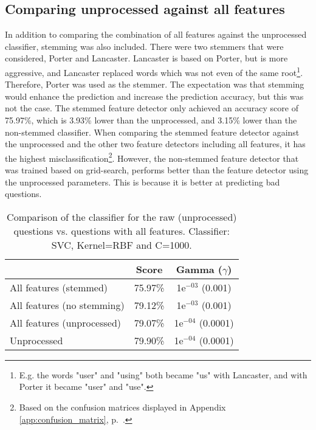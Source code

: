 \subsection{Comparing unprocessed against all features}
\label{sec:comparing_unprocessed_all_features}
In addition to comparing the combination of all features against the unprocessed classifier, stemming was also included. 
There were two stemmers that were considered, Porter and Lancaster.
Lancaster is based on Porter, but is more aggressive, and Lancaster replaced words which was not even of the same root\footnote{
	E.g. the words "user" and "using" both became "us" with Lancaster, and with Porter it became "user" and "use".
}.
Therefore, Porter was used as the stemmer.
\vspace{0.5em}\newline
The expectation was that stemming would enhance the prediction and increase the prediction accuracy, but this was not the case. 
The stemmed feature detector only achieved an accuracy score of 75.97\%, which is 3.93\% lower than the unprocessed, and 3.15\% lower than the non-stemmed classifier.
When comparing the stemmed feature detector against the unprocessed and the other two feature detectors including all features, it has the highest misclassification\footnote{ 
	Based on the confusion matrices displayed in Appendix \ref{app:confusion_matrix}, p.~\pageref{app:confusion_matrix}.
}.
However, the non-stemmed feature detector that was trained based on grid-search, performs better than the feature detector using the unprocessed parameters.
This is because it is better at predicting bad questions.


\begin{table}[!h]%
	\centering
	\begin{tabular}{| l | c | c |}
		\hline
		~ 							& Score		& Gamma ($\gamma$)		\\ \hline
		All features (stemmed)		& 75.97\%	& 1e$^{-03}$ (0.001)	\\ \hline
		All features (no stemming)	& 79.12\%	& 1e$^{-03}$ (0.001)	\\ \hline
		All features (unprocessed)	& 79.07\%	& 1e$^{-04}$ (0.0001)	\\ \hline
		Unprocessed					& 79.90\%	& 1e$^{-04}$ (0.0001)	\\ \hline
	\end{tabular}
	\caption{Comparison of the classifier for the raw (unprocessed) questions vs. questions with all features. Classifier: SVC, Kernel=RBF and C=1000.}
	\label{tab:unprocessed_vs_all_feature_detectors_svc_so}
\end{table}











